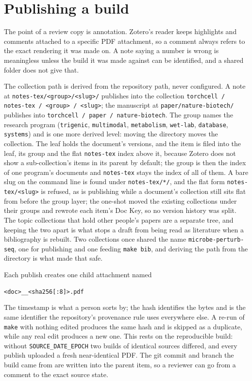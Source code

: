 
\section{Publishing a build}
\label{sec:publishing}

The point of a review copy is annotation. Zotero's reader keeps highlights and
comments attached to a specific PDF attachment, so a comment always refers to the
exact rendering it was made on. A note saying a number is wrong is meaningless
unless the build it was made against can be identified, and a shared folder does
not give that.

The collection path is derived from the repository path, never configured. A
note at \texttt{notes-tex/<group>/<slug>/} publishes into the collection
\texttt{torchcell / notes-tex / <group> / <slug>}; the manuscript at
\texttt{paper/nature-biotech/} publishes into \texttt{torchcell / paper / nature-biotech}. The group names the research
program (\texttt{trigenic}, \texttt{multimodal}, \texttt{metabolism},
\texttt{wet-lab}, \texttt{database}, \texttt{systems}) and is one more derived
level: moving the directory moves the collection. The leaf holds the document's
versions, and the item is filed into the leaf, its group and the flat
\texttt{notes-tex} index above it, because Zotero does not show a sub-collection's
items in its parent by default; the group is then the index of one program's
documents and \texttt{notes-tex} stays the index of all of them. A bare slug on
the command line is found under \texttt{notes-tex/*/}, and the flat form
\texttt{notes-tex/<slug>} is refused, as is publishing while a document's
collection still sits flat from before the group layer; the one-shot
 moved the existing collections under
their groups and rewrote each item's Doc Key, so no version history was split. The topic collections that
hold other people's papers are a separate tree, and keeping the two apart is what
stops a draft from being read as literature when a bibliography is rebuilt. Two
collections once shared the name \texttt{microbe-perturb-seq}, one for publishing
and one feeding \texttt{make bib}, and deriving the path from the directory is what
made that safe.

Each publish creates one child attachment named
\begin{center}
\texttt{<doc>\_<YYYY-MM-DD-HH-MM-SS>\_<sha256[:8]>.pdf}
\end{center}
The timestamp is what a
person sorts by; the hash identifies the bytes and is the same identifier the
repository's provenance rule uses everywhere else. A re-run of \texttt{make} with
nothing edited produces the same hash and is skipped as a duplicate, while any
real edit produces a new one. This rests on the reproducible build: without
\texttt{SOURCE\_DATE\_EPOCH} two builds of identical sources differed, and every
publish uploaded a fresh near-identical PDF. The git commit and branch the build
came from are written into the parent item, so a reviewer can go from a comment to
the exact source state.

